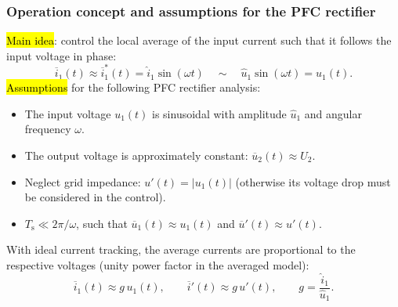 \begin{frame}
	\frametitle{Operation concept and assumptions for the PFC rectifier}
	\hl{Main idea}: control the local average of the input current such that it follows the input voltage in phase:
	\begin{equation}
		\overline{i}_1(t) \approx \overline{i}_1^*(t)=\hat{i}_1\sin(\omega t)
		\quad \sim \quad \hat{u}_1\sin(\omega t)=u_1(t).
		\label{eq:PFC_current_voltage_proportionality}
	\end{equation}\pause
	\hl{Assumptions} for the following PFC rectifier analysis:
	\begin{itemize}
		\item The input voltage $u_1(t)$ is sinusoidal with amplitude $\hat{u}_1$ and angular frequency $\omega$.\pause
		\item The output voltage is approximately constant: $\overline{u}_2(t)\approx U_2$.\pause
		\item Neglect grid impedance: $u'(t)=|u_1(t)|$ (otherwise its voltage drop must be considered in the control).
		\item $T_\mathrm{s}\ll 2\pi/\omega$, such that $\overline{u}_1(t)\approx u_1(t)$ and $\overline{u}'(t)\approx u'(t)$.
	\end{itemize}\pause
	With ideal current tracking, the average currents are proportional to the respective voltages (unity power factor in the averaged model):
	\begin{equation}
		\overline{i}_1(t)\approx g\,u_1(t),\qquad \overline{i}'(t)\approx g\,u'(t),\qquad g=\frac{\hat{i}_1}{\hat{u}_1}.
	\end{equation}
\end{frame}

